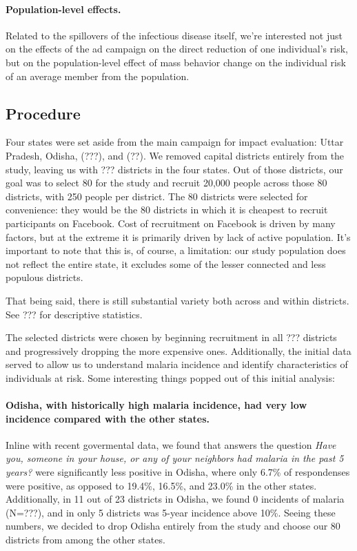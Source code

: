 \documentclass[a4paper,12pt]{article}
\theoremstyle{proposition}
\begin{document}
\paragraph{Population-level effects.} Related to the spillovers of the infectious disease itself, we're interested not just on the effects of the ad campaign on the direct reduction of one individual's risk, but on the population-level effect of mass behavior change on the individual risk of an average member from the population.


\subsection{Procedure}

Four states were set aside from the main campaign for impact evaluation: Uttar Pradesh, Odisha, (???), and (??). We removed capital districts entirely from the study, leaving us with ??? districts in the four states. Out of those districts, our goal was to select 80 for the study and recruit 20,000 people across those 80 districts, with 250 people per district. The 80 districts were selected for convenience: they would be the 80 districts in which it is cheapest to recruit participants on Facebook. Cost of recruitment on Facebook is driven  by many factors, but at the extreme it is primarily driven by lack of active population. It's important to note that this is, of course, a limitation: our study population does not reflect the entire state, it excludes some of the lesser connected and less populous districts.

That being said, there is still substantial variety both across and within districts. See ??? for descriptive statistics.


The selected districts were chosen by beginning recruitment in all ??? districts and progressively dropping the more expensive ones. Additionally, the initial data served to allow us to understand malaria incidence and identify characteristics of individuals at risk. Some interesting things popped out of this initial analysis:

\paragraph{Odisha, with historically high malaria incidence, had very low incidence compared with the other states.} Inline with recent govermental data, we found that answers the question \textit{Have you, someone in your house, or any of your neighbors had malaria in the past 5 years?} were significantly less positive in Odisha, where only 6.7\% of respondenses were positive, as opposed to 19.4\%, 16.5\%, and 23.0\% in the other states. Additionally, in 11 out of 23 districts in Odisha, we found 0 incidents of malaria (N=???), and in only 5 districts was 5-year incidence above 10\%. Seeing these numbers, we decided to drop Odisha entirely from the study and choose our 80 districts from among the other states.
\end{document}
